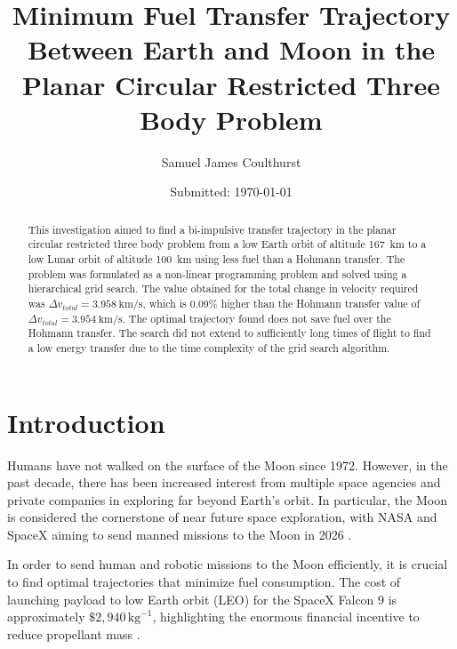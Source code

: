 \documentclass[10pt,twocolumn]{revtex4-2}    %
\begin{document}
\title{Minimum Fuel Transfer Trajectory Between Earth and Moon in the Planar Circular Restricted Three Body Problem} 
\date{Submitted: \today{}}
\author{Samuel James Coulthurst}


\begin{abstract}              

This investigation aimed to find a bi-impulsive transfer trajectory in the planar circular restricted three body problem from a low Earth orbit of altitude 167~km to a low Lunar orbit of altitude 100~km using less fuel than a Hohmann transfer. The problem was formulated as a non-linear programming problem and solved using a hierarchical grid search. The value obtained for the total change in velocity required was $\Delta v_{total} = 3.958 ~\mathrm{km/s}$, which is 0.09\% higher than the Hohmann transfer value of $\Delta v_{total} = 3.954~\mathrm{km/s}$. The optimal trajectory found does not save fuel over the Hohmann transfer. The search did not extend to sufficiently long times of flight to find a low energy transfer due to the time complexity of the grid search algorithm. 

\end{abstract}

\maketitle

\thispagestyle{plain} %

\section{Introduction} 

Humans have not walked on the surface of the Moon since 1972. However, in the past decade, there has been increased interest from multiple space agencies and private companies in exploring far beyond Earth's orbit. In particular, the Moon is considered the cornerstone of near future space exploration, with NASA and SpaceX aiming to send manned missions to the Moon in 2026 \cite{ESA_ref_cornerstone, nasa_artemis}. 

\vspace{0.5em}

In order to send human and robotic missions to the Moon efficiently, it is crucial to find optimal trajectories that minimize fuel consumption. The cost of launching payload to low Earth orbit (LEO) for the SpaceX Falcon 9 is approximately $\$2{,}940 \, \text{kg}^{-1}$, highlighting the enormous financial incentive to reduce propellant mass \cite{jones2023}. 
\end{document}
